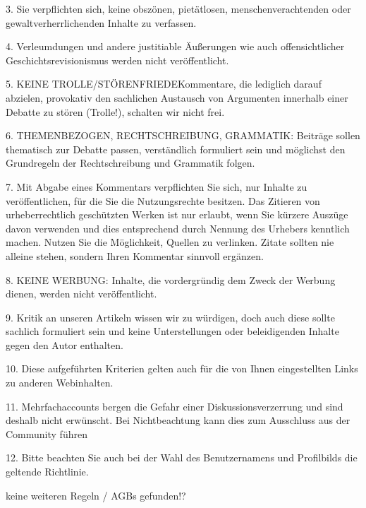 3. Sie verpflichten sich, keine obszönen, pietätlosen, menschenverachtenden oder gewaltverherrlichenden Inhalte zu verfassen.

4. Verleumdungen und andere justitiable Äußerungen wie auch offensichtlicher Geschichtsrevisionismus werden nicht veröffentlicht.

5. KEINE TROLLE/STÖRENFRIEDEKommentare, die lediglich darauf abzielen, provokativ den sachlichen Austausch von Argumenten innerhalb einer Debatte zu stören (Trolle!), schalten wir nicht frei.

6. THEMENBEZOGEN, RECHTSCHREIBUNG, GRAMMATIK: Beiträge sollen thematisch zur Debatte passen, verständlich formuliert sein und möglichst den Grundregeln der Rechtschreibung und Grammatik folgen.

7. Mit Abgabe eines Kommentars verpflichten Sie sich, nur Inhalte zu veröffentlichen, für die Sie die Nutzungsrechte besitzen. Das Zitieren von urheberrechtlich geschützten Werken ist nur erlaubt, wenn Sie kürzere Auszüge davon verwenden und dies entsprechend durch Nennung des Urhebers kenntlich machen. Nutzen Sie die Möglichkeit, Quellen zu verlinken. Zitate sollten nie alleine stehen, sondern Ihren Kommentar sinnvoll ergänzen.

8. KEINE WERBUNG: Inhalte, die vordergründig dem Zweck der Werbung dienen, werden nicht veröffentlicht.

9. Kritik an unseren Artikeln wissen wir zu würdigen, doch auch diese sollte sachlich formuliert sein und keine Unterstellungen oder beleidigenden Inhalte gegen den Autor enthalten.

10. Diese aufgeführten Kriterien gelten auch für die von Ihnen eingestellten Links zu anderen Webinhalten.

11. Mehrfachaccounts bergen die Gefahr einer Diskussionsverzerrung und sind deshalb nicht erwünscht. Bei Nichtbeachtung kann dies zum Ausschluss aus der Community führen

12. Bitte beachten Sie auch bei der Wahl des Benutzernamens und Profilbilds die geltende Richtlinie.

keine weiteren Regeln / AGBs gefunden!?
